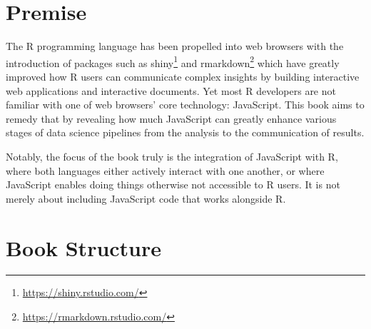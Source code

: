 \documentclass[
  10pt,
]{krantz}
\renewcommand{\href}[2]{#2\footnote{\url{#1}}}
\begin{document}
\hypertarget{premise}{%
\section*{Premise}\label{premise}}


The R programming language has been propelled into web browsers with the introduction of packages such as \href{https://shiny.rstudio.com/}{shiny} \citep{R-shiny} and \href{https://rmarkdown.rstudio.com/}{rmarkdown} \citep{R-rmarkdown} which have greatly improved how R users can communicate complex insights by building interactive web applications and interactive documents. Yet most R developers are not familiar with one of web browsers' core technology: JavaScript. This book aims to remedy that by revealing how much JavaScript can greatly enhance various stages of data science pipelines from the analysis to the communication of results.

Notably, the focus of the book truly is the integration of JavaScript with R, where both languages either actively interact with one another, or where JavaScript enables doing things otherwise not accessible to R users. It is not merely about including JavaScript code that works alongside R.

\hypertarget{book-structure}{%
\section*{Book Structure}\label{book-structure}}
\end{document}
